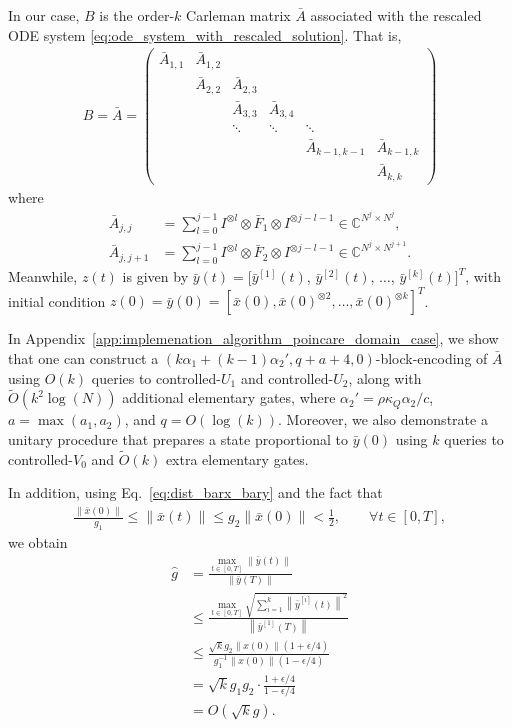 \documentclass[superscriptaddress,onecolumn,nofootinbib,longbibliography,a4paper,accepted=2026-09-29]{quantumarticle}
\theoremstyle{plain}
\theoremstyle{definition}
\numberwithin{thm}{section}
\numberwithin{assumption}{section}
\numberwithin{lemma}{section}
\numberwithin{prop}{section}
\numberwithin{cor}{section}
\numberwithin{definition}{section}
\numberwithin{rmk}{section}
\numberwithin{equation}{section}
\newcommand{\norm}[1]     {\left\| #1 \right\|}
\newcommand{\myC}{\mathbb{C}}
\newcommand{\lrb}[1]{\left ( #1 \right )}
\newcommand{\mylog}[1]{\operatorname{log} \lrb{#1}}
\newcommand{\mymax}[1]{\operatorname{max}\lrb{#1}}
\newcommand{\myO}[1]{O\lrb{#1}}
\newcommand{\mytO}[1]{\tilde{O}\lrb{#1}}
\begin{document}
In our case, $B$ is the order-$k$ Carleman matrix $\bar{A}$ associated with the rescaled ODE system \eqref{eq:ode_system_with_rescaled_solution}. That is,
\begin{align}
    B = \bar{A} = \begin{pmatrix}
    \bar{A}_{1,1} & \bar{A}_{1,2} & & & &\\
     & \bar{A}_{2,2} & \bar{A}_{2,3} & & &\\
            &  & \bar{A}_{3,3} & \bar{A}_{3,4} &       & \\
            &         & \ddots   & \ddots   & \ddots & \\
            &         &         &  & \bar{A}_{k-1,k-1}  & \bar{A}_{k-1,k}\\      
            &         &         &         &   & \bar{A}_{k,k}
    \end{pmatrix}
\end{align}
where
\begin{align}
\bar{A}_{j,j}&=\sum_{l=0}^{j-1} I^{\otimes l} \otimes \bar{F}_1 \otimes I^{\otimes j-l-1} \in \myC^{N^j\times N^j},
\label{eq:carleman_linearization_def_ajj_bar}\\ 
\bar{A}_{j,j+1}&=\sum_{l=0}^{j-1} I^{\otimes l} \otimes \bar{F}_2 \otimes I^{\otimes j-l-1} \in \myC^{N^{j}\times N^{j+1}}.
\end{align}
Meanwhile, $z(t)$ is given by $\bar{y}(t)=[\bar{y}^{[1]}(t)$, $\bar{y}^{[2]}(t)$, $\dots$, $\bar{y}^{[k]}(t)]^T$, with initial condition $z(0)=\bar{y}(0)=[\bar{x}(0), \bar{x}(0)^{\otimes 2}, \dots, \bar{x}(0)^{\otimes k}]^T$. 

In Appendix~\ref{app:implemenation_algorithm_poincare_domain_case}, we show that one can construct a
$(k\alpha_1+(k-1)\alpha_2', q+a+4, 0)$-block-encoding of $\bar{A}$ using $\myO{k}$ queries to controlled-$U_1$ and controlled-$U_2$, along with $\mytO{k^2 \mylog{N}}$ additional elementary gates, where $\alpha_2'=\rho \kappa_Q\alpha_2/c$, $a=\mymax{a_1,a_2}$, and $q=\myO{\mylog{k}}$. Moreover, we also demonstrate a unitary procedure that prepares a state proportional to $\bar{y}(0)$ 
using $k$ queries to controlled-$V_0$ and $\mytO{k}$ extra elementary gates.

In addition, using Eq.~\eqref{eq:dist_barx_bary} and the fact that
\begin{align}
\frac{\norm{\bar{x}(0)}}{g_1} \le \norm{\bar{x}(t)} \le g_2\norm{\bar{x}(0)} < \frac{1}{2}, \qquad \forall t \in [0, T], 
\end{align}
we obtain
\begin{align}
\hat{g} &=\frac{\max_{t \in [0,T]} \norm{\bar{y}(t)}}{\norm{\bar{y}(T)}}  \\
& 
\le \frac{\max_{t \in [0,T]} \sqrt{\sum_{i=1}^k \norm{\bar{y}^{[i]}(t)}^2}}{\norm{\bar{y}^{[1]}(T)}} \\
&\le \frac{\sqrt{k}g_2\norm{x(0)} (1+\epsilon/4)}{g_1^{-1}\norm{x(0)}(1-\epsilon/4)} \\
&= \sqrt{k}g_1g_2 \cdot \frac{1+\epsilon/4}{1-\epsilon/4} \\
&= \myO{\sqrt{k} g}.    
\end{align}
\end{document}
